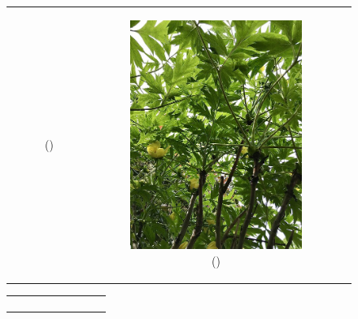 \documentclass{BachelorBUI}
\begin{document}
\begin{figure}[h]
\begin{tabular}{ccc}
\begin{subfigure}{0.40\textwidth}
                    \caption{\centering (\cite{2_artificial_background:2019})}
                \end{subfigure} &
                \begin{subfigure}{0.25\textwidth}
                    \centering
                    \includegraphics[width=\textwidth]{3_artificial_background.jpg}
                    \caption{\centering (\cite{3_artificial_background:2022})}
                \end{subfigure} \\
            \end{tabular}
            \begin{tabular}{ccc}
                \begin{subfigure}{0.30\textwidth}
                    \centering

\end{subfigure}
\end{tabular}
\end{figure}
\end{document}
